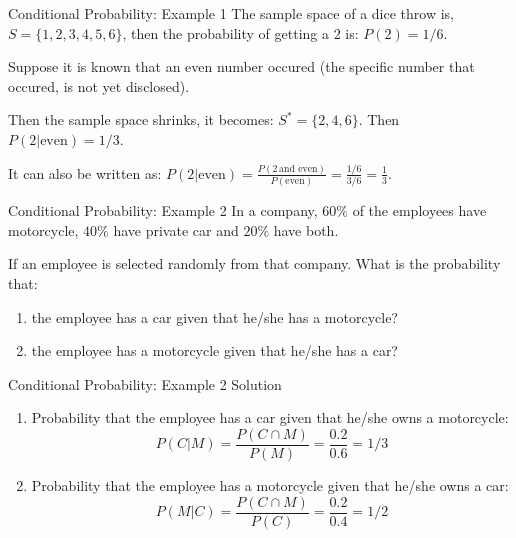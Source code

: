 \documentclass[12pt, aspectratio=169]{beamer}
\begin{document}
	\begin{frame}{Conditional Probability: Example 1}
		The sample space of a dice throw is, $S = \{1, 2, 3, 4, 5, 6\}$, then the probability of getting a $2$ is: $P(2) = 1/6$.

		\vspace{1.5em}

		Suppose it is known that an even number occured (the specific number that occured, is not yet disclosed).
		
		\vspace{0.5em}
		
		Then the sample space shrinks, it becomes: $S^* = \{2, 4, 6\}$. Then $P(2 | \text{even}) = 1/3$.

		\vspace{1.5em}

		It can also be written as: $P(2 | \text{even}) = \frac{P(2 \, \text{and even})}{P(\text{even})} = \frac{1/6}{3/6} = \frac{1}{3}$.
	\end{frame}

	
	\begin{frame}{Conditional Probability: Example 2}
		In a company, $60\%$ of the employees have motorcycle, $40\%$ have private car and $20\%$ have both.
		
		\vspace{0.5em}

		If an employee is selected randomly from that company. What is the probability that:

		\begin{enumerate}
			\item the employee has a car given that he/she has a motorcycle?
			\item the employee has a motorcycle given that he/she has a car?
		\end{enumerate}
	\end{frame}


	\begin{frame}{Conditional Probability: Example 2 Solution}
		\begin{enumerate}
			\item Probability that the employee has a car given that he/she owns a motorcycle:
				\[P(C|M) = \frac{P(C \cap M)}{P(M)} = \frac{0.2}{0.6} = 1/3\]

			\item Probability that the employee has a motorcycle given that he/she owns a car:
				\[P(M|C) = \frac{P(C \cap M)}{P(C)} = \frac{0.2}{0.4} = 1/2\]
		\end{enumerate}
	\end{frame}
\end{document}
